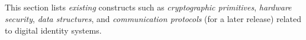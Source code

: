 \subsection{\sfi}
\label{sub:foundations}

This section lists \emph{existing} constructs such as \emph{cryptographic primitives}, \emph{hardware security}, \emph{data structures}, and \emph{communication protocols} (for a later release) related to digital identity systems.
